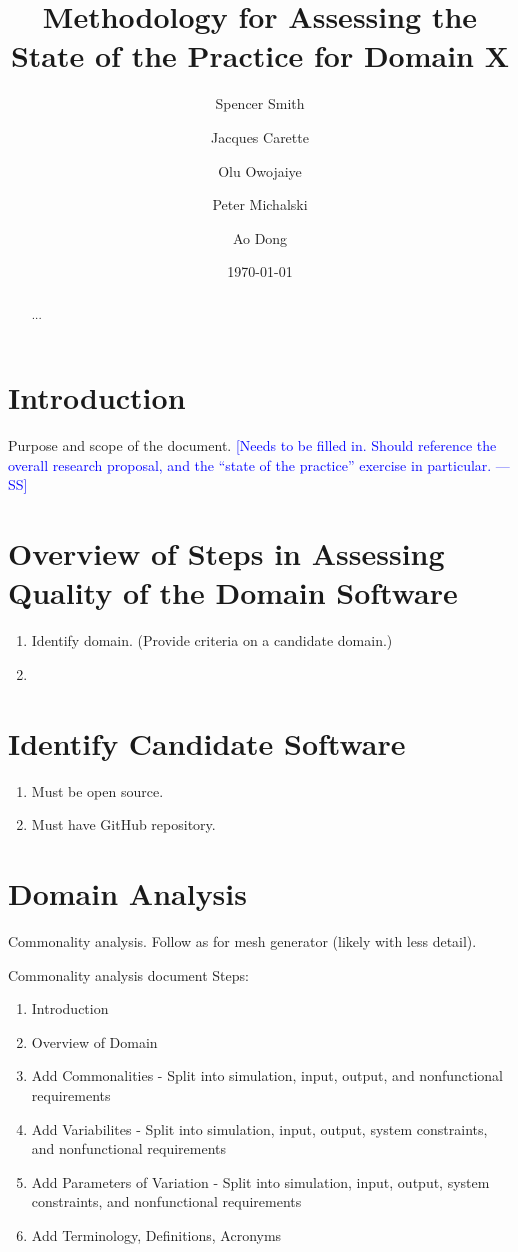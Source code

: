 \documentclass[letterpaper,cleveref]{lipics-v2019}
\title{Methodology for Assessing the State of the Practice for Domain X}
\author{Spencer Smith}{McMaster University, Canada}{smiths@mcmaster.ca}{}{}
\author{Jacques Carette}{McMaster University, Canada}{carette@mcmaster.ca}{}{}
\author{Olu Owojaiye}{McMaster University, Canada}{owojaiyo@mcmaster.ca}{}{}
\author{Peter Michalski}{McMaster University, Canada}{michap@mcmaster.ca}{}{}
\author{Ao Dong}{McMaster University, Canada}{donga9@mcmaster.ca}{}{}
\date{\today}
\newcommand{\authornote}[3]{\textcolor{#1}{[#3 ---#2]}}
\newcommand{\authornote}[3]{}
\newcommand{\wss}[1]{\authornote{blue}{SS}{#1}} %
\theoremstyle{definition}
\begin{document}
\maketitle

\begin{abstract}
	...
\end{abstract}

\tableofcontents

\section{Introduction} \label{SecIntroduction}

Purpose and scope of the document.  \wss{Needs to be filled in.  Should
	reference the overall research proposal, and the ``state of the practice''
	exercise in particular.}

\section{Overview of Steps in Assessing Quality of the Domain Software}

\begin{enumerate}
\item Identify domain.  (Provide criteria on a candidate domain.)
\item 
\end{enumerate}

\section{Identify Candidate Software}

\begin{enumerate}
	\item Must be open source.
	\item Must have GitHub repository.
\end{enumerate}

\section{Domain Analysis} \label{SecDomainAnalysis}

Commonality analysis.  Follow as for mesh generator (likely with less detail).

Commonality analysis document Steps:
\begin{enumerate}
	\item Introduction
	\item Overview of Domain
	\item Add Commonalities - Split into simulation, input, output, and nonfunctional requirements
	\item Add Variabilites - Split into simulation, input, output, system constraints, and nonfunctional requirements
	\item Add Parameters of Variation - Split into simulation, input, output, system constraints, and nonfunctional requirements
	\item Add Terminology, Definitions, Acronyms
\end{enumerate}
\end{document}
